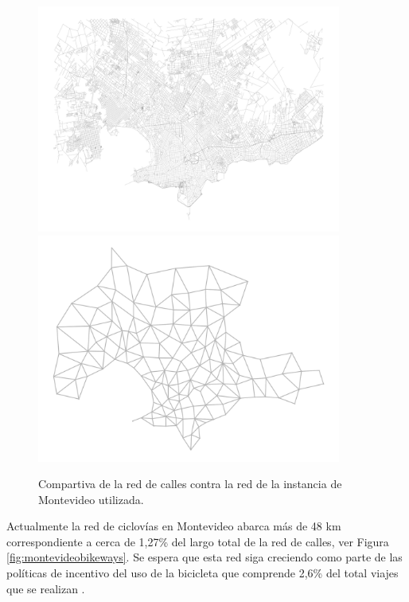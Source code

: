 \begin{figure}[h!]
  \centering
  \includegraphics[width=10cm]{../resources/montevideo_full.png}
  \includegraphics[width=10cm]{../resources/montevideo_simple.png}
  \caption{Compartiva de la red de calles contra la red de la instancia de Montevideo utilizada.}
  \label{fig:montevideosimplification}
\end{figure}

Actualmente la red de ciclovías en Montevideo abarca más de 48 km correspondiente a cerca de 1,27\% del largo total de la red de calles, ver Figura \ref{fig:montevideobikeways}. Se espera que esta red siga creciendo como parte de las políticas de incentivo del uso de la bicicleta que comprende 2,6\% del total viajes que se realizan \cite{Mauttone2017a}.


